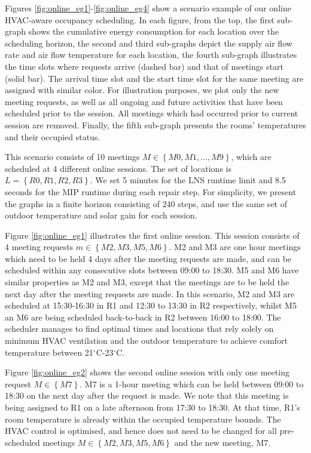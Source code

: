 Figures \ref{fig:online_eg1}-\ref{fig:online_eg4} show a scenario example of our online HVAC-aware occupancy scheduling. In each figure, from the top, the first sub-graph shows the cumulative energy consumption for each location over the scheduling horizon, the second and third sub-graphs depict the supply air flow rate and air flow temperature for each location, the fourth sub-graph illustrates the time slots where requests arrive (dashed bar) and that of meetings start (solid bar). The arrival time slot and the start time slot for the same meeting are assigned with similar color. For illustration purposes, we plot only the new meeting requests, as well as all ongoing and future activities that have been scheduled prior to the session. All meetings which had occurred prior to current session are removed. Finally, the fifth sub-graph presents the rooms' temperatures and their occupied status.

This scenario consists of 10 meetings $M \in \left\{M0, M1,\ldots, M9\right\}$, which are scheduled at 4 different online sessions. The set of locations is $L = \left\{R0, R1, R2, R3\right\}$. We set 5 minutes for the LNS runtime limit and 8.5 seconds for the MIP runtime during each repair step. For simplicity, we present the graphs in a finite horizon consisting of 240 steps, and use the same set of outdoor temperature and solar gain for each session.

Figure \ref{fig:online_eg1} illustrates the first online session. This session consists of 4 meeting requests $m \in \left\{M2, M3, M5, M6\right\}$. M2 and M3 are one hour meetings which need to be held 4 days after the meeting requests are made, and can be scheduled within any consecutive slots between 09:00 to 18:30. M5 and M6 have similar properties as M2 and M3, except that the meetings are to be held the next day after the meeting requests are made. In this scenario, M2 and M3 are scheduled at 15:30-16:30 in R1 and 12:30 to 13:30 in R2 respectively, whilst M5 an M6 are being scheduled back-to-back in R2 between 16:00 to 18:00.
The scheduler manages to find optimal times and locations that rely solely on minimum HVAC ventilation and the outdoor temperature to achieve comfort temperature between 21$^\circ$C-23$^\circ$C.

Figure \ref{fig:online_eg2} shows the second online session with only one meeting request $M \in \left\{M7\right\}$. M7 is a 1-hour meeting which can be held between 09:00 to 18:30 on the next day after the request is made. We note that this meeting is being assigned to R1 on a late afternoon from 17:30 to 18:30. At that time, R1's room temperature is already within the occupied temperature bounds. The HVAC control is optimised, and hence does not need to be changed for all pre-scheduled meetings  $M \in \left\{M2, M3, M5, M6\right\}$ and the new meeting, M7.

